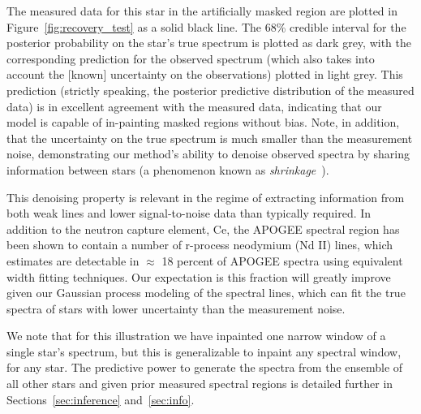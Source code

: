 \documentclass[a4paper,fleqn,usenatbib]{mnras}
\begin{document}
The measured data for this star in the artificially masked region are plotted in Figure~\ref{fig:recovery_test} as a solid black line. The 68\% credible interval for the posterior probability on the star's true spectrum is plotted as dark grey, with the corresponding prediction for the observed spectrum (which also takes into account the [known] uncertainty on the observations) plotted in light grey. This prediction (strictly speaking, the posterior predictive distribution of the measured data) is in excellent agreement with the measured data, indicating that our model is capable of in-painting masked regions without bias. Note, in addition, that the uncertainty on the true spectrum is much smaller than the measurement noise, demonstrating our method's ability to denoise observed spectra by sharing information between stars (a phenomenon known as {\it shrinkage}~\citep[see, e.g.,][Chapter 13]{Busemeyer_etal:2015}).

This denoising property is relevant in the regime of extracting information from both weak lines and lower signal-to-noise data than typically required. In addition to the neutron capture element, Ce, the APOGEE spectral region has been shown to contain a number of r-process neodymium (Nd II) lines, which~\citet{Hasselquist_etal:2016} estimates are detectable in $\approx$ 18 percent of APOGEE spectra using equivalent width fitting techniques. Our expectation is this fraction will greatly improve given our Gaussian process modeling of the spectral lines, which can fit the true spectra of stars with lower uncertainty than the measurement noise.


We note that for this illustration we have inpainted one narrow window of a single star's spectrum, but this is generalizable to inpaint any spectral window, for any star. The predictive power to generate the spectra from the ensemble of all other stars and given prior measured spectral regions is detailed further in Sections~\ref{sec:inference} and~\ref{sec:info}. 
\end{document}
